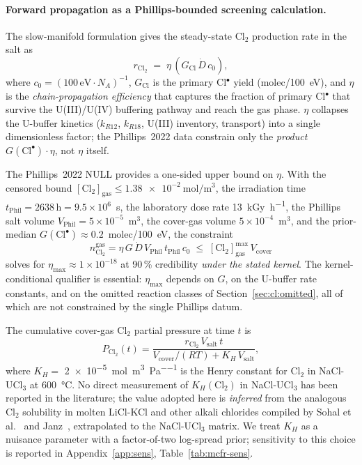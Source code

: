 \documentclass[11pt]{article}
\theoremstyle{plain}
\theoremstyle{definition}
\theoremstyle{remark}
\begin{document}
\paragraph{Forward propagation as a Phillips-bounded screening calculation.}
The slow-manifold formulation gives the steady-state Cl$_2$ production rate
in the salt as
\begin{equation}
r_{\mathrm{Cl_2}}\;=\;\eta\,(G_{\mathrm{Cl}}\,\dot{D}\,c_0),
\label{eq:rcl2}
\end{equation}
where $c_0 = (100\,\mathrm{eV} \cdot N_A)^{-1}$, $G_{\mathrm{Cl}}$ is the
primary Cl$^{\bullet}$ yield (molec/100~eV), and $\eta$ is the
\emph{chain-propagation efficiency} that captures the fraction of primary
Cl$^{\bullet}$ that survive the U(III)/U(IV) buffering pathway and reach
the gas phase.  $\eta$ collapses the U-buffer kinetics ($k_{R12}$,
$k_{R18}$, U(III) inventory, transport) into a single dimensionless
factor; the Phillips~2022 data constrain only the \emph{product}
$G(\mathrm{Cl}^{\bullet})\cdot\eta$, not $\eta$ itself.

The Phillips~2022 NULL provides a one-sided upper bound on $\eta$.  With
the censored bound $[\mathrm{Cl}_2]_{\mathrm{gas}} \leq
\SI{1.38e-2}{\mol\per\meter\cubed}$, the irradiation time
$t_{\mathrm{Phil}} = 2638\,\mathrm{h} = 9.5\!\times\!10^6$~s, the
laboratory dose rate \SI{13}{\kilo\gray\per\hour}, the Phillips salt
volume $V_{\mathrm{Phil}} = 5\!\times\!10^{-5}$~m$^3$, the cover-gas
volume $5\!\times\!10^{-4}$~m$^3$, and the prior-median
$G(\mathrm{Cl}^{\bullet}) \approx 0.2$~molec/100~eV, the constraint
\begin{equation}
n_{\mathrm{Cl}_2}^{\mathrm{gas}} = \eta\,G\,\dot{D}\,V_{\mathrm{Phil}}\,
   t_{\mathrm{Phil}}\,c_0 \;\leq\;
   [\mathrm{Cl}_2]_{\mathrm{gas}}^{\max}\,V_{\mathrm{cover}}
\label{eq:eta-bound}
\end{equation}
solves for $\eta_{\max}\approx 1\!\times\!10^{-18}$ at 90\,\%
credibility \emph{under the stated kernel}.  The kernel-conditional
qualifier is essential: $\eta_{\max}$ depends on $G$, on the U-buffer
rate constants, and on the omitted reaction classes of
Section~\ref{sec:cl:omitted}, all of which are not constrained by the
single Phillips datum.

The cumulative cover-gas Cl$_2$ partial pressure at time $t$ is
\begin{equation}
P_{\mathrm{Cl_2}}(t) = \frac{r_{\mathrm{Cl_2}}\,V_{\mathrm{salt}}\,t}
                            {V_{\mathrm{cover}}/(R T) + K_H\,V_{\mathrm{salt}}},
\label{eq:Pcl2-t}
\end{equation}
where $K_H = $ \SI{2e-5}{\mol\per\meter\cubed\per\pascal} is the Henry
constant for Cl$_2$ in NaCl-UCl$_3$ at \SI{600}{\celsius}.  No direct
measurement of $K_H(\mathrm{Cl}_2)$ in NaCl-UCl$_3$ has been reported in
the literature; the value adopted here is \emph{inferred} from the
analogous Cl$_2$ solubility in molten LiCl-KCl and other alkali chlorides
compiled by Sohal et al.~\citep{Sohal2010} and Janz~\citep{Janz1988},
extrapolated to the NaCl-UCl$_3$ matrix.  We treat $K_H$ as a nuisance
parameter with a factor-of-two log-spread prior; sensitivity to this
choice is reported in Appendix~\ref{app:sens}, Table~\ref{tab:mcfr-sens}.
\end{document}
